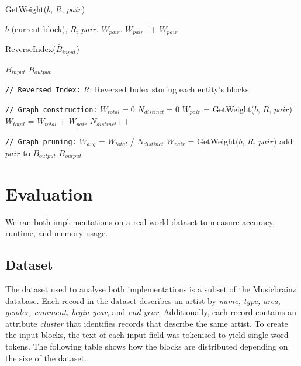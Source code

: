 \documentclass[a4paper,12pt]{article}
\begin{document}
\begin{algorithm}[H]
\caption{{\sc GetWeight($b$, $\bar R$, $pair$)}}
\begin{algorithmic}
\REQUIRE $b$ (current block), $\bar R$, $pair$.
\ENSURE $W_{pair}$.
        \STATE $W_{pair}$++
      \ELSE
      \ENDIF
    \ENDFOR
  \ENDFOR
  \RETURN $W_{pair}$
\end{algorithmic}
\end{algorithm}

\begin{algorithm}[H]
\caption{{\sc ReverseIndex($\bar B_{input}$)}}
\begin{algorithmic}
\REQUIRE $\bar B_{input}$
\ENSURE $\bar B_{output}$

\STATE \texttt{// Reversed Index:}
\STATE $\bar R$: Reversed Index storing each entity's blocks.

\STATE \texttt{// Graph construction:}
\STATE $W_{total} = 0$
\STATE $N_{distinct} = 0$
    \STATE $W_{pair}$ = GetWeight($b$, $\bar R$, $pair$)
      \STATE $W_{total}$ = $W_{total}$ + $W_{pair}$
      \STATE $N_{distinct}$++
    \ENDIF
  \ENDFOR
\ENDFOR

\STATE \texttt{// Graph pruning:}
\STATE $W_{avg}$ = $W_{total}$ / $N_{distinct}$
    \STATE $W_{pair}$ = GetWeight($b$, $R$, $pair$)
      \STATE add $pair$ to $\bar B_{output}$
    \ENDIF
  \ENDFOR
\ENDFOR
\RETURN $\bar B_{output}$ \\
\end{algorithmic}
\end{algorithm}

\newpage
\section{Evaluation}
We ran both implementations on a real-world dataset to measure accuracy, runtime, and memory usage.

\subsection{Dataset}
The dataset used to analyse both implementations is a subset of the Musicbrainz database. Each record in the dataset describes an artist by \emph{name, type, area, gender, comment, begin year}, and \emph{end year}. Additionally, each record contains an attribute \emph{cluster} that identifies records that describe the same artist. To create the input blocks, the text of each input field was tokenised to yield single word tokens. The following table shows how the blocks are distributed depending on the size of the dataset.
\end{document}
